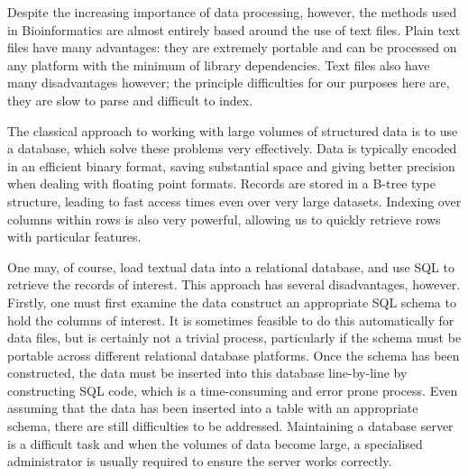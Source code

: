 \documentclass{bioinfo}
\begin{document}
Despite the increasing importance of data processing, however, the methods 
used in Bioinformatics are almost entirely 
based around the use of text files. Plain text files have many advantages:
they are extremely portable and can be processed on 
any platform with the minimum of library dependencies. Text files also 
have many disadvantages however; the principle difficulties for our 
purposes here are, they are slow to parse and difficult to index.


The classical approach to working with large volumes of 
structured data is to use a database, which solve these 
problems very effectively.
Data is typically encoded in an efficient binary 
format, saving substantial space and giving better precision when 
dealing with floating point formats. Records are stored in a
B-tree type structure, leading to fast access times even 
over very large datasets. Indexing over columns within rows is 
also very powerful, allowing us to quickly retrieve 
rows with particular features. 

One may, of course, load textual data into a relational database, and 
use SQL to retrieve the records of interest. This approach has several 
disadvantages, however. Firstly, one must first examine the data 
construct an appropriate SQL schema to hold the columns 
of interest. It is sometimes feasible to do this automatically 
for data files, but is certainly not a trivial process, 
particularly if the schema 
must be portable across different relational database platforms.
Once the schema has been constructed, the data must be inserted into 
this database line-by-line by constructing SQL code, which is a 
time-consuming and error prone process. Even assuming that the data 
has been inserted into a table with an appropriate schema, there 
are still difficulties to be addressed. Maintaining a database 
server is a difficult task and when the volumes of data become
large, a specialised administrator is usually required to 
ensure the server works correctly.
\end{document}
